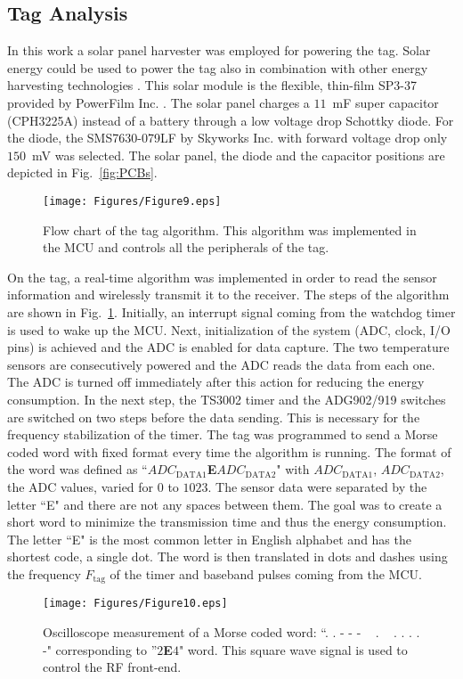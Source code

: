 \documentclass[journal]{IEEEtran}
\begin{document}
\subsection{Tag Analysis}
\label{subsec:taganalysis}

In this work  a solar panel harvester was employed  for powering the tag.
%
Solar  energy could be used to power the tag also in combination with other energy harvesting technologies \cite{niotaki2014solar}. 
%
This solar module is the flexible, thin-film SP3-37  provided by  PowerFilm Inc. \cite{SP3-37}.
%
The solar panel charges a $11$~mF super capacitor (CPH3225A) instead of a battery through a low voltage drop  Schottky diode. 
%
For the diode, the SMS7630-079LF by Skyworks Inc. with forward voltage drop only $150$~mV was selected. 
%
The solar panel, the diode and the capacitor positions are depicted in Fig.~\ref{fig:PCBs}. 

\begin{figure}[t]
\centering
\texttt{[image: Figures/Figure9.eps]}
\caption{Flow chart of the tag algorithm. This algorithm was implemented in the MCU and controls all the peripherals of the tag.}
\label{fig:tagalgorithm}
\end{figure}


On the tag, a real-time algorithm  was implemented in order to read
the sensor information and  wirelessly transmit it to the receiver. 
%
The steps of the algorithm are  shown in Fig.~\ref{fig:tagalgorithm}.
%
Initially, an interrupt signal coming from  the watchdog timer is used to wake up the MCU. 
%
Next, initialization of the system (ADC, clock, I/O pins) is achieved and the ADC is enabled for data capture.  
%
The two temperature sensors are  consecutively powered  and the ADC
reads the data from each one.
%
The ADC is turned off immediately after this action for reducing the energy consumption.
%
In the next step, the  TS3002 timer and the  ADG902/919 switches are switched on two steps before the data sending.
%
 This is necessary for the frequency stabilization of the timer.
%
The tag was programmed to send a Morse coded word with fixed format
every time  the algorithm is running.
% 
The format of the word was defined as  ``$ADC_\text{DATA1}$\textbf{E}$ADC_\text{DATA2}$"
with $ADC_\text{DATA1}$, $ADC_\text{DATA2}$,  the ADC values, varied for $0$ to $1023$. 
%
The sensor data were separated by the letter ``E" and there are not any spaces between them. 
%
The goal was to create a short word to minimize the  transmission time and thus the energy consumption.
% 
The letter ``E" is the most common letter in English alphabet and has the shortest code, a single dot.
%
The word is then translated in dots and dashes using the frequency  $F_\text{tag}$ of the timer and  baseband pulses coming from the MCU. 
%
\begin{figure}[t]
\centering
\texttt{[image: Figures/Figure10.eps]}
\caption{Oscilloscope measurement of a Morse coded word: ``. . - - - ~ . ~ . . . . -" corresponding to ''$2$\textbf{E}$4$" word. This  square wave signal is used to control the RF front-end.}
\label{fig:word}
\end{figure}
%
\end{document}
